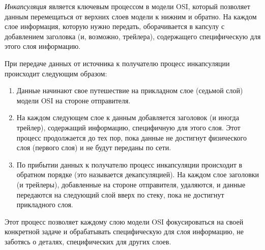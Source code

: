 \textit{Инкапсуляция} является ключевым процессом в модели OSI, который позволяет данным перемещаться от верхних слоев модели к нижним и обратно. На каждом слое информация, которую нужно передать, оборачивается в капсулу с добавлением заголовка (и, возможно, трейлера), содержащего специфическую для этого слоя информацию. 

При передаче данных от источника к получателю процесс инкапсуляции происходит следующим образом:

\begin{enumerate}
\item Данные начинают свое путешествие на прикладном слое (седьмой слой) модели OSI на стороне отправителя.
\item На каждом следующем слое к данным добавляется заголовок (и иногда трейлер), содержащий информацию, специфичную для этого слоя. Этот процесс продолжается до тех пор, пока данные не достигнут физического слоя (первого слоя) и не будут переданы по сети.
\item По прибытии данных к получателю процесс инкапсуляции происходит в обратном порядке (это называется декапсуляцией). На каждом слое заголовки (и трейлеры), добавленные на стороне отправителя, удаляются, и данные передаются на следующий слой вверх по стеку, пока не достигнут прикладного слоя.
\end{enumerate}

Этот процесс позволяет каждому слою модели OSI фокусироваться на своей конкретной задаче и обрабатывать специфическую для слоя информацию, не заботясь о деталях, специфических для других слоев.

